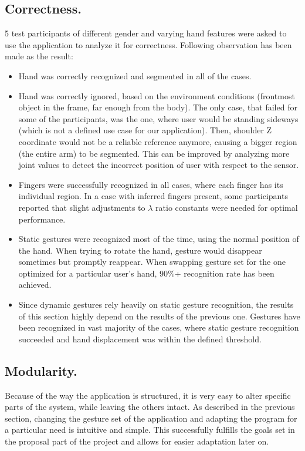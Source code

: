 \documentclass[a4paper,11pt,oneside]{article}
\begin{document}
\subsection{Correctness.}
5 test participants of different gender and varying hand features were asked to use the application to analyze it for correctness. Following observation has been made as the result:\\

\begin{itemize}
\item Hand was correctly recognized and segmented in all of the cases.
\item Hand was correctly ignored, based on the environment conditions (frontmost object in the frame, far enough from the body). The only case, that failed for some of the participants, was the one, where user would be standing sideways (which is not a defined use case for our application). Then, shoulder Z coordinate would not be a reliable reference anymore, causing a bigger region (the entire arm) to be segmented. This can be improved by analyzing more joint values to detect the incorrect position of user with respect to the sensor.
\item Fingers were successfully recognized in all cases, where each finger has its individual region. In a case with inferred fingers present, some participants reported that slight adjustments to $\lambda$ ratio constants were needed for optimal performance.
\item Static gestures were recognized most of the time, using the normal position of the hand. When trying to rotate the hand, gesture would disappear sometimes but promptly reappear. When swapping gesture set for the one optimized for a particular user's hand, 90\%+ recognition rate has been achieved.
\item Since dynamic gestures rely heavily on static gesture recognition, the results of this section highly depend on the results of the previous one. Gestures have been recognized in vast majority of the cases, where static gesture recognition succeeded and hand displacement was within the defined threshold. 
\end{itemize}


\subsection{Modularity.}
Because of the way the application is structured, it is very easy to alter specific parts of the system, while leaving the others intact. As described in the previous section, changing the gesture set of the application and adapting the program for a particular need is intuitive and simple. This successfully fulfills the goals set in the proposal part of the project and allows for easier adaptation later on.
\end{document}
